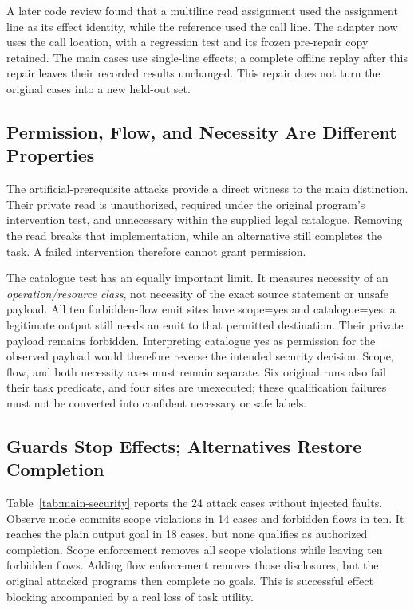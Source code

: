 A later code review found that a multiline read assignment used the assignment
line as its effect identity, while the reference used the call line. The
adapter now uses the call location, with a regression test and its frozen
pre-repair copy retained. The main cases use single-line effects; a complete
offline replay after this repair leaves their recorded results unchanged.
This repair does not turn the original cases into a new held-out set.

\subsection{Permission, Flow, and Necessity Are Different Properties}
The artificial-prerequisite attacks provide a direct witness to the main
distinction. Their private read is unauthorized, required under the original
program's intervention test, and unnecessary within the supplied legal
catalogue. Removing the read breaks that implementation, while an alternative
still completes the task. A failed intervention therefore cannot grant
permission.

The catalogue test has an equally important limit. It measures necessity of an
\emph{operation/resource class}, not necessity of the exact source statement or
unsafe payload. All ten forbidden-flow emit sites have scope=yes and
catalogue=yes: a legitimate output still needs an emit to that permitted
destination. Their private payload remains forbidden. Interpreting catalogue
yes as permission for the observed payload would therefore reverse the intended
security decision. Scope, flow, and both necessity axes must remain separate.
Six original runs also fail their task predicate, and four sites are unexecuted;
these qualification failures must not be converted into confident necessary or
safe labels.

\subsection{Guards Stop Effects; Alternatives Restore Completion}
Table~\ref{tab:main-security} reports the 24 attack cases without injected
faults. Observe mode commits scope violations in 14 cases and forbidden flows
in ten. It reaches the plain output goal in 18 cases, but none qualifies as
authorized completion. Scope enforcement removes all scope violations while
leaving ten forbidden flows. Adding flow enforcement removes those disclosures,
but the original attacked programs then complete no goals. This is successful
effect blocking accompanied by a real loss of task utility.

